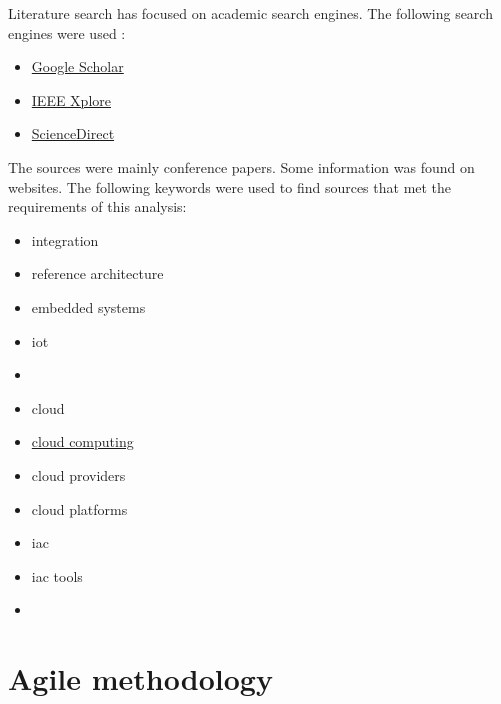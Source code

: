 Literature search has focused on academic search engines. The following search engines were used :
\begin{itemize}
    \item \href{https://scholar.google.com}{Google Scholar}
    \item \href{https://ieeexplore.ieee.org/Xplore/home.jsp}{IEEE Xplore}
    \item \href{https://www.sciencedirect.com}{ScienceDirect}
\end{itemize}
The sources were mainly conference papers. Some information was found on websites. The following keywords were used to find sources that met the requirements of this analysis:
\begin{itemize}
    \item integration
    \item reference architecture
    \item embedded systems
    \item \acrshort{iot}
    \item {}
    \item \gls{cloud}
    \item \hyperref[subsec:cloudcomputing]{cloud computing}
    \item \gls{cloud} providers
    \item \gls{cloud} platforms
    \item \acrlong{iac}
    \item \acrshort{iac} tools
    \item {}
\end{itemize}


\section{Agile methodology}


